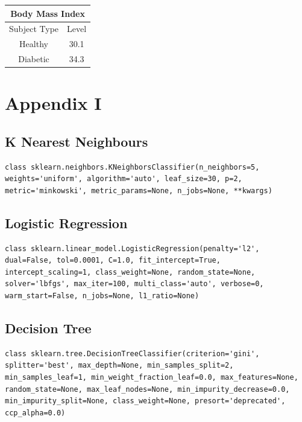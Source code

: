 \documentclass[12pt]{article}
\begin{document}
\begin{table}[]
\centering
\begin{tabular}{|c|c|}
\hline
\multicolumn{2}{|c|}{Body Mass Index} \\ \hline
Subject Type      & Level     \\ \hline
Healthy           & 30.1      \\ \hline
Diabetic          & 34.3      \\ \hline
\end{tabular}
\label{table:12}
\end{table}

\newpage
\clearpage

\section{Appendix I}
\subsection{K Nearest Neighbours}
\begin{lstlisting}
class sklearn.neighbors.KNeighborsClassifier(n_neighbors=5, weights='uniform', algorithm='auto', leaf_size=30, p=2, metric='minkowski', metric_params=None, n_jobs=None, **kwargs)
\end{lstlisting}

\subsection{Logistic Regression}
\begin{lstlisting}
class sklearn.linear_model.LogisticRegression(penalty='l2', dual=False, tol=0.0001, C=1.0, fit_intercept=True, intercept_scaling=1, class_weight=None, random_state=None, solver='lbfgs', max_iter=100, multi_class='auto', verbose=0, warm_start=False, n_jobs=None, l1_ratio=None)
\end{lstlisting}

\subsection{Decision Tree}
\begin{lstlisting}
class sklearn.tree.DecisionTreeClassifier(criterion='gini', splitter='best', max_depth=None, min_samples_split=2, min_samples_leaf=1, min_weight_fraction_leaf=0.0, max_features=None, random_state=None, max_leaf_nodes=None, min_impurity_decrease=0.0, min_impurity_split=None, class_weight=None, presort='deprecated', ccp_alpha=0.0)
\end{lstlisting}
\end{document}
